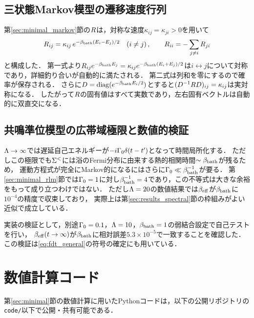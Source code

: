 \documentclass[a4paper,11pt,onecolumn,baselineskip=14.5pt]{jlreq}
\begin{document}
\subsection{三状態Markov模型の遷移速度行列}
\label{sec:appendix_rate}

第\ref{sec:minimal_markov}節の$R$は，対称な速度$\kappa_{ij}=\kappa_{ji}>0$を用いて
\begin{equation}
  R_{ij} = \kappa_{ij}\,e^{-\beta_{\mathrm{bath}}(E_i-E_j)/2}\quad(i\neq j)\,,
  \qquad
  R_{ii} = -\sum_{j\neq i}R_{ji}
  \label{eq:rate_matrix}
\end{equation}
と構成した．
第一式より$R_{ij}e^{-\beta_{\mathrm{bath}} E_j}=\kappa_{ij}e^{-\beta_{\mathrm{bath}}(E_i+E_j)/2}$は$i\leftrightarrow j$について対称であり，詳細釣り合いが自動的に満たされる．
第二式は列和を零にするので確率が保存される．
さらに$D=\mathrm{diag}(e^{-\beta_{\mathrm{bath}} E_i/2})$とすると$(D^{-1}R D)_{ij}=\kappa_{ij}$は実対称になる．
したがって$R$の固有値はすべて実数であり，左右固有ベクトルは自動的に双直交になる．

\subsection{共鳴準位模型の広帯域極限と数値的検証}
\label{sec:appendix_rlm}

$\Lambda\to\infty$では遅延自己エネルギーが$-i\Gamma_0\delta(t-t')$となって時間局所化する．
ただしこの極限でも$\Sigma^{<}$には浴のFermi分布に由来する熱的相関時間$\sim\beta_{\mathrm{bath}}$が残るため，
運動方程式が完全にMarkov的になるにはさらに$\Gamma_0\ll\beta_{\mathrm{bath}}^{-1}$が要る．
第\ref{sec:minimal_rlm}節では$\Gamma_0=1$に対し$\beta_{\mathrm{bath}}^{-1}=4$であり，この不等式は大きな余裕をもって成り立つわけではない．
ただし$\Lambda=20$の数値結果では$\beta_{\mathrm{eff}}$が$\beta_{\mathrm{bath}}$に$10^{-4}$の精度で収束しており，
実際上は第\ref{sec:results_spectral}節の枠組みがよい近似で成立している．

実装の検証として，別途$\Gamma_0=0.1$，$\Lambda=10$，$\beta_{\mathrm{bath}}=1$の弱結合設定で自己テストを行い，
$\beta_{\mathrm{eff}}(t\to\infty)$が$\beta_{\mathrm{bath}}$に相対誤差$5.3\times10^{-5}$で一致することを確認した．
この検証は\eqref{eq:fdt_general}の符号の確定にも用いている．

\section{数値計算コード}
\label{sec:appendix_code}

第\ref{sec:minimal}節の数値計算に用いたPythonコードは，以下の公開リポジトリの\texttt{code/}以下で公開・共有可能である．
\end{document}
